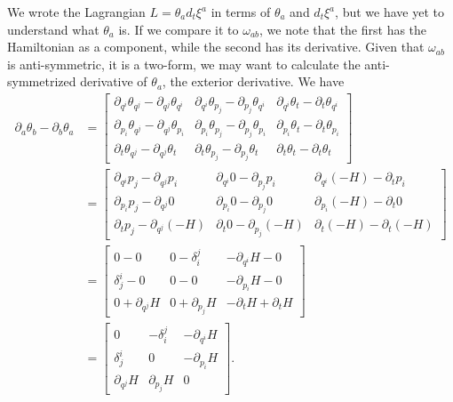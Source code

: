 We wrote the Lagrangian $L = \theta_a d_t \xi^a$ in terms of $\theta_a$ and $d_t \xi^a$, but we have yet to understand what $\theta_a$ is. If we compare it to  $\omega_{ab}$, we note that the first has the Hamiltonian as a component, while the second has its derivative. Given that $\omega_{ab}$ is anti-symmetric, it is a two-form, we may want to calculate the anti-symmetrized derivative of $\theta_a$, the exterior derivative. We have
\begin{equation}
	\begin{aligned}
		\partial_a \theta_b - \partial_b \theta_a &=
		\left[\begin{array}{ccc}
			\partial_{q^i} \theta_{q^j} - \partial_{q^j} \theta_{q^i} & \partial_{q^i} \theta_{p_j} - \partial_{p_j} \theta_{q^i} & \partial_{q^i} \theta_{t} - \partial_{t} \theta_{q^i} \\
			\partial_{p_i} \theta_{q^j} - \partial_{q^j} \theta_{p_i} & \partial_{p_i} \theta_{p_j} - \partial_{p_j} \theta_{p_i} & \partial_{p_i} \theta_{t} - \partial_{t} \theta_{p_i} \\
			\partial_{t} \theta_{q^j} - \partial_{q^j} \theta_{t} &
			\partial_{t} \theta_{p_j} - \partial_{p_j} \theta_{t} &
			\partial_{t} \theta_{t} - \partial_{t} \theta_{t} 
		\end{array} \right] \\
		&= \left[\begin{array}{ccc}
			\partial_{q^i} p_j - \partial_{q^j} p_i & \partial_{q^i} 0 - \partial_{p_j} p_i & \partial_{q^i} (-H) - \partial_{t} p_i \\
			\partial_{p_i} p_j - \partial_{q^j} 0 & \partial_{p_i} 0 - \partial_{p_j} 0 & \partial_{p_i} (-H) - \partial_{t} 0 \\
			\partial_{t} p_j - \partial_{q^j} (-H) &
			\partial_{t} 0 - \partial_{p_j} (-H) &
			\partial_{t} (-H) - \partial_{t} (-H) 
		\end{array} \right] \\
		&= \left[\begin{array}{ccc}
		0 - 0 & 0 - \delta_i^j & - \partial_{q^i} H - 0 \\
		\delta^i_j - 0 &  0 - 0 & - \partial_{p_i} H - 0 \\
		0 + \partial_{q^j} H &
		0 + \partial_{p_j} H &
		- \partial_{t} H + \partial_{t} H 
	\end{array} \right] \\
		&= \left[\begin{array}{ccc}
			0 & -\delta_i^j & - \partial_{q^i} H \\
			\delta^i_j &  0 & - \partial_{p_i} H \\
			\partial_{q^j} H &
			\partial_{p_j} H &
			0
		\end{array} \right].
	\end{aligned}
\end{equation}
